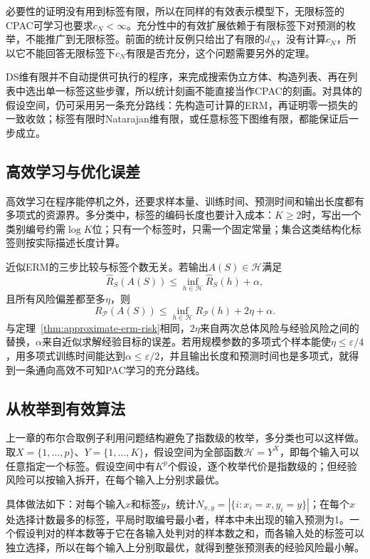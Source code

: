 必要性的证明没有用到标签有限，所以在同样的有效表示模型下，无限标签的CPAC可学习也要求$c_N<\infty$。充分性中的有效扩展依赖于有限标签下对预测的枚举，不能推广到无限标签。前面的统计反例只给出了有限的$d_N$，没有计算$c_N$，所以它不能回答无限标签下$c_N$有限是否充分，这个问题需要另外的定理。

DS维有限并不自动提供可执行的程序，来完成搜索伪立方体、构造列表、再在列表中选出单一标签这些步骤，所以统计刻画不能直接当作CPAC的刻画。对具体的假设空间，仍可采用另一条充分路线：先构造可计算的ERM，再证明零一损失的一致收敛；标签有限时Natarajan维有限，或任意标签下图维有限，都能保证后一步成立。

\subsection{高效学习与优化误差}

高效学习在程序能停机之外，还要求样本量、训练时间、预测时间和输出长度都有多项式的资源界。多分类中，标签的编码长度也要计入成本：$K\geq2$时，写出一个类别编号约需$\log K$位；只有一个标签时，只需一个固定常量；集合这类结构化标签则按实际描述长度计算。

近似ERM的三步比较与标签个数无关。若输出$A(S)\in\mathcal H$满足
\[
 \hat R_S(A(S))\leq\inf_{h\in\mathcal H}\hat R_S(h)+\alpha,
\]
且所有风险偏差都至多$\eta$，则
\[
 R_{\mathcal P}(A(S))\leq\inf_{h\in\mathcal H}R_{\mathcal P}(h)+2\eta+\alpha.
\]
与定理~\ref{thm:approximate-erm-risk}相同，$2\eta$来自两次总体风险与经验风险之间的替换，$\alpha$来自近似求解经验目标的误差。若用规模参数的多项式个样本能使$\eta\leq\varepsilon/4$，用多项式训练时间能达到$\alpha\leq\varepsilon/2$，并且输出长度和预测时间也是多项式，就得到一条通向高效不可知PAC学习的充分路线。

\subsection{从枚举到有效算法}

上一章的布尔合取例子利用问题结构避免了指数级的枚举，多分类也可以这样做。取$X=\{1,\ldots,p\}$、$Y=\{1,\ldots,K\}$，假设空间为全部函数$\mathcal H=Y^X$，即每个输入可以任意指定一个标签。假设空间中有$K^p$个假设，逐个枚举代价是指数级的；但经验风险可以按输入拆开，在每个输入上分别求最优。

具体做法如下：对每个输入$x$和标签$y$，统计$N_{x,y}=|\{i:x_i=x,y_i=y\}|$；在每个$x$处选择计数最多的标签，平局时取编号最小者，样本中未出现的输入预测为1。一个假设判对的样本数等于它在各输入处判对的样本数之和，而各输入处的标签可以独立选择，所以在每个输入上分别取最优，就得到整张预测表的经验风险最小解。

